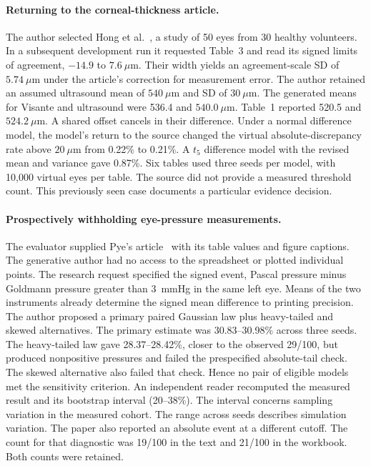 \paragraph{Returning to the corneal-thickness article.}
The author selected Hong et al.~\cite{hongpachymetry}, a study of 50 eyes from 30 healthy volunteers. In a subsequent development run it requested Table~3 and read its signed limits of agreement, $-14.9$ to $7.6~\mu$m. Their width yields an agreement-scale SD of $5.74~\mu$m under the article's correction for measurement error. The author retained an assumed ultrasound mean of $540~\mu$m and SD of $30~\mu$m. The generated means for Visante and ultrasound were 536.4 and $540.0~\mu$m. Table~1 reported 520.5 and $524.2~\mu$m. A shared offset cancels in their difference. Under a normal difference model, the model's return to the source changed the virtual absolute-discrepancy rate above $20~\mu$m from 0.22\% to 0.21\%. A $t_5$ difference model with the revised mean and variance gave 0.87\%. Six tables used three seeds per model, with 10,000 virtual eyes per table. The source did not provide a measured threshold count. This previously seen case documents a particular evidence decision.

\paragraph{Prospectively withholding eye-pressure measurements.}
The evaluator supplied Pye's article~\cite{pyeiop} with its table values and figure captions. The generative author had no access to the spreadsheet or plotted individual points. The research request specified the signed event, Pascal pressure minus Goldmann pressure greater than 3~mmHg in the same left eye. Means of the two instruments already determine the signed mean difference to printing precision. The author proposed a primary paired Gaussian law plus heavy-tailed and skewed alternatives. The primary estimate was 30.83--30.98\% across three seeds. The heavy-tailed law gave 28.37--28.42\%, closer to the observed 29/100, but produced nonpositive pressures and failed the prespecified absolute-tail check. The skewed alternative also failed that check. Hence no pair of eligible models met the sensitivity criterion. An independent reader recomputed the measured result and its bootstrap interval (20--38\%). The interval concerns sampling variation in the measured cohort. The range across seeds describes simulation variation. The paper also reported an absolute event at a different cutoff. The count for that diagnostic was 19/100 in the text and 21/100 in the workbook. Both counts were retained.

